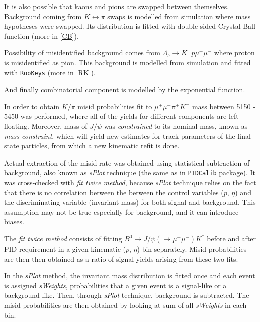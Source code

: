 It is also possible that kaons and pions are swapped between themselves. Background coming from $K \leftrightarrow \pi$ swaps is modelled from simulation where mass hypotheses were swapped. Its distribution is fitted with double sided Crystal Ball function \cite{Skwarnicki:1986xj} (more in \autoref{CB}).

Possibility of misidentified background comes from $\Lambda_{b} \rightarrow K^{-} p \mu^{+} \mu^{-}$ where proton is misidentified as pion. This background is modelled from simulation and fitted with \texttt{RooKeys} (more in \autoref{RK}).

And finally combinatorial component is modelled by the exponential function.

In order to obtain $K/\pi$ misid probabilities fit to $\mu^{+} \mu^{-} \pi^{+} K^{-}$ mass between 5150 - 5450 \mevcc was performed, where all of the yields for different components are left floating. Moreover, mass of $J/\psi$ was \textit{constrained} to its nominal mass, known as \textit{mass constraint}, which will yield new estimates for track parameters of the final state particles, from which a new kinematic refit is done.

Actual extraction of the misid rate was obtained using statistical subtraction of background, also known as \textit{sPlot} technique (the same as in \texttt{PIDCalib} package). It was cross-checked with \textit{fit twice method}, because \textit{sPlot} technique relies on the fact that there is no correlation between the between the control variables ($p$, $\eta$) and the discriminating variable (invariant mass) for both signal and background. This assumption may not be true especially for background, and it can introduce biases.

The \textit{fit twice method} consists of fitting $B^{0} \rightarrow J/\psi(\rightarrow \mu^{+} \mu^{-}) K^{*}$ before and after \gls{PID} requirement in a given kinematic ($p$, $\eta$) bin separately. Misid probabilities are then then obtained as a ratio of signal yields arising from these two fits.

In the \textit{sPlot} method, the invariant mass distribution is fitted once and each event is assigned \textit{sWeights}, probabilities that a given event is a signal-like or a background-like. Then, through \textit{sPlot} technique, background is subtracted. The misid probabilities are then obtained by looking at sum of all \textit{sWeights} in each bin.

